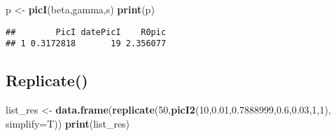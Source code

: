 \documentclass[
]{article}
\newenvironment{Shaded}{\begin{snugshade}}{\end{snugshade}}
\newcommand{\DataTypeTok}[1]{\textcolor[rgb]{0.13,0.29,0.53}{#1}}
\newcommand{\DecValTok}[1]{\textcolor[rgb]{0.00,0.00,0.81}{#1}}
\newcommand{\FloatTok}[1]{\textcolor[rgb]{0.00,0.00,0.81}{#1}}
\newcommand{\KeywordTok}[1]{\textcolor[rgb]{0.13,0.29,0.53}{\textbf{#1}}}
\newcommand{\NormalTok}[1]{#1}
\newcommand{\StringTok}[1]{\textcolor[rgb]{0.31,0.60,0.02}{#1}}
\begin{document}
\begin{Shaded}
\begin{Highlighting}[]
\NormalTok{p <-}\StringTok{ }\KeywordTok{picI}\NormalTok{(beta,gamma,s)}
\KeywordTok{print}\NormalTok{(p)}
\end{Highlighting}
\end{Shaded}

\begin{verbatim}
##        PicI datePicI    R0pic
## 1 0.3172818       19 2.356077
\end{verbatim}

\hypertarget{replicate}{%
\subsection{Replicate()}\label{replicate}}

\begin{Shaded}
\begin{Highlighting}[]
\NormalTok{list_res <-}\StringTok{ }\KeywordTok{data.frame}\NormalTok{(}\KeywordTok{replicate}\NormalTok{(}\DecValTok{50}\NormalTok{,}\KeywordTok{picI2}\NormalTok{(}\DecValTok{10}\NormalTok{,}\FloatTok{0.01}\NormalTok{,}\FloatTok{0.7888999}\NormalTok{,}\FloatTok{0.6}\NormalTok{,}\FloatTok{0.03}\NormalTok{,}\DecValTok{1}\NormalTok{,}\DecValTok{1}\NormalTok{), }\DataTypeTok{simplify=}\NormalTok{T))}
\KeywordTok{print}\NormalTok{(list_res)}
\end{Highlighting}
\end{Shaded}
\end{document}
